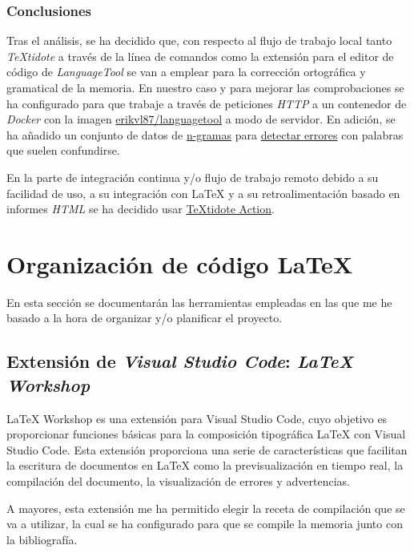 \subsubsection{Conclusiones}

Tras el análisis, se ha decidido que, con respecto al flujo de trabajo local tanto \textit{TeXtidote} a través de la línea de comandos como la extensión para el editor de código de \textit{LanguageTool} se van a emplear para la corrección ortográfica y gramatical de la memoria. En nuestro caso y para mejorar las comprobaciones se ha configurado para que trabaje a través de peticiones \textit{HTTP} a un contenedor de \textit{Docker} con la imagen \href{https://hub.docker.com/r/erikvl87/languagetool}{erikvl87/languagetool} a modo de servidor. En adición, se ha añadido un conjunto de datos de \href{https://es.wikipedia.org/wiki/N-grama}{n-gramas} para \href{https://dev.languagetool.org/finding-errors-using-n-gram-data}{detectar errores} con palabras que suelen confundirse.

En la parte de integración continua y/o flujo de trabajo remoto debido a su facilidad de uso, a su integración con \LaTeX{} y a su retroalimentación basado en informes \textit{HTML} se ha decidido usar \href{https://github.com/marketplace/actions/textidote-action}{TeXtidote Action}.

\section{Organización de código \LaTeX{}}

En esta sección se documentarán las herramientas empleadas en las que me he basado a la hora de organizar y/o planificar el proyecto.

\subsection{Extensión de \textit{Visual Studio Code}: \textit{LaTeX Workshop}}

LaTeX Workshop es una extensión para Visual Studio Code, cuyo objetivo es proporcionar funciones básicas para la composición tipográfica LaTeX con Visual Studio Code. Esta extensión proporciona una serie de características que facilitan la escritura de documentos en LaTeX como la previsualización en tiempo real, la compilación del documento, la visualización de errores y advertencias.

A mayores, esta extensión me ha permitido elegir la receta de compilación que se va a utilizar, la cual se ha configurado para que se compile la memoria junto con la bibliografía.

